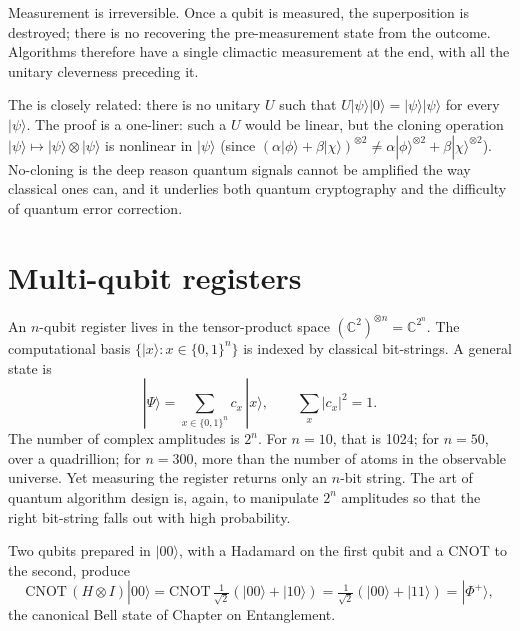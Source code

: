 \begin{remark}
Measurement is irreversible. Once a qubit is measured, the superposition is destroyed; there is no recovering the pre-measurement state from the outcome. Algorithms therefore have a single climactic measurement at the end, with all the unitary cleverness preceding it.
\end{remark}

The  \citep{nielsen_quantum_2010} is closely related: there is no unitary $U$ such that $U|\psi\rangle|0\rangle = |\psi\rangle|\psi\rangle$ for every $|\psi\rangle$. The proof is a one-liner: such a $U$ would be linear, but the cloning operation $|\psi\rangle \mapsto |\psi\rangle\otimes|\psi\rangle$ is nonlinear in $|\psi\rangle$ (since $(\alpha|\phi\rangle+\beta|\chi\rangle)^{\otimes 2} \neq \alpha|\phi\rangle^{\otimes 2} + \beta|\chi\rangle^{\otimes 2}$). No-cloning is the deep reason quantum signals cannot be amplified the way classical ones can, and it underlies both quantum cryptography and the difficulty of quantum error correction.

\section{Multi-qubit registers}

An $n$-qubit register lives in the tensor-product space $(\mathbb{C}^2)^{\otimes n} = \mathbb{C}^{2^n}$. The computational basis $\{|x\rangle : x \in \{0,1\}^n\}$ is indexed by classical bit-strings. A general state is
\[
  |\Psi\rangle = \sum_{x \in \{0,1\}^n} c_x\,|x\rangle, \qquad \sum_x |c_x|^2 = 1.
\]
The number of complex amplitudes is $2^n$. For $n=10$, that is 1024; for $n=50$, over a quadrillion; for $n=300$, more than the number of atoms in the observable universe. Yet measuring the register returns only an $n$-bit string. The art of quantum algorithm design is, again, to manipulate $2^n$ amplitudes so that the right bit-string falls out with high probability.

\begin{example}
Two qubits prepared in $|00\rangle$, with a Hadamard on the first qubit and a CNOT to the second, produce
\[
  \mathrm{CNOT}\,(H\otimes I)|00\rangle = \mathrm{CNOT}\,\tfrac{1}{\sqrt 2}(|00\rangle+|10\rangle) = \tfrac{1}{\sqrt 2}(|00\rangle+|11\rangle) = |\Phi^+\rangle,
\]
the canonical Bell state of Chapter on Entanglement.
\end{example}

